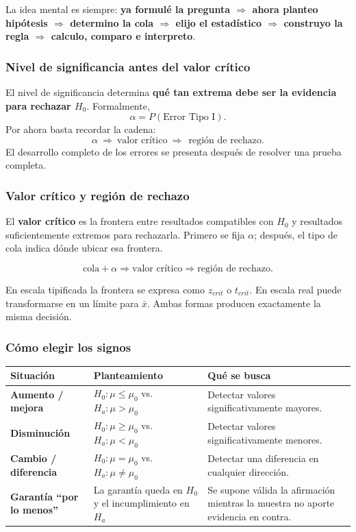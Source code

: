 \documentclass[11pt,a4paper]{article}
\begin{document}
\begin{regla}
La idea mental es siempre: \textbf{ya formulé la pregunta $\Rightarrow$ ahora planteo hipótesis $\Rightarrow$ determino la cola $\Rightarrow$ elijo el estadístico $\Rightarrow$ construyo la regla $\Rightarrow$ calculo, comparo e interpreto}.
\end{regla}

\subsubsection{Nivel de significancia antes del valor crítico}

El nivel de significancia determina \textbf{qué tan extrema debe ser la evidencia para rechazar $H_0$}. Formalmente,
\[
\alpha=P(\text{Error Tipo I}).
\]
Por ahora basta recordar la cadena:
\[
\boxed{\alpha}\ \Longrightarrow\ \boxed{\text{valor crítico}}\ \Longrightarrow\
\ \boxed{\text{región de rechazo}}.
\]
El desarrollo completo de los errores se presenta después de resolver una prueba completa.

\subsubsection{Valor crítico y región de rechazo}

El \textbf{valor crítico} es la frontera entre resultados compatibles con $H_0$ y resultados suficientemente extremos para rechazarla. Primero se fija $\alpha$; después, el tipo de cola indica dónde ubicar esa frontera.

\[
\boxed{\text{cola} + \alpha}
\Longrightarrow
\boxed{\text{valor crítico}}
\Longrightarrow
\boxed{\text{región de rechazo}}.
\]

En escala tipificada la frontera se expresa como $z_{crit}$ o $t_{crit}$. En escala real puede transformarse en un límite para $\bar{x}$. Ambas formas producen exactamente la misma decisión.

\subsubsection{Cómo elegir los signos}

\begin{table}[H]
\centering
\small
\begin{tabularx}{\textwidth}{>{\bfseries}p{3cm} X X}
\toprule
Situación & Planteamiento & Qué se busca \\
\midrule
Aumento / mejora & $H_0:\mu\le\mu_0$ vs. $H_a:\mu>\mu_0$ & Detectar valores significativamente mayores.\\
Disminución & $H_0:\mu\ge\mu_0$ vs. $H_a:\mu<\mu_0$ & Detectar valores significativamente menores.\\
Cambio / diferencia & $H_0:\mu=\mu_0$ vs. $H_a:\mu\neq\mu_0$ & Detectar una diferencia en cualquier dirección.\\
Garantía ``por lo menos'' & La garantía queda en $H_0$ y el incumplimiento en $H_a$ & Se supone válida la afirmación mientras la muestra no aporte evidencia en contra.\\
\bottomrule
\end{tabularx}
\end{table}
\end{document}

